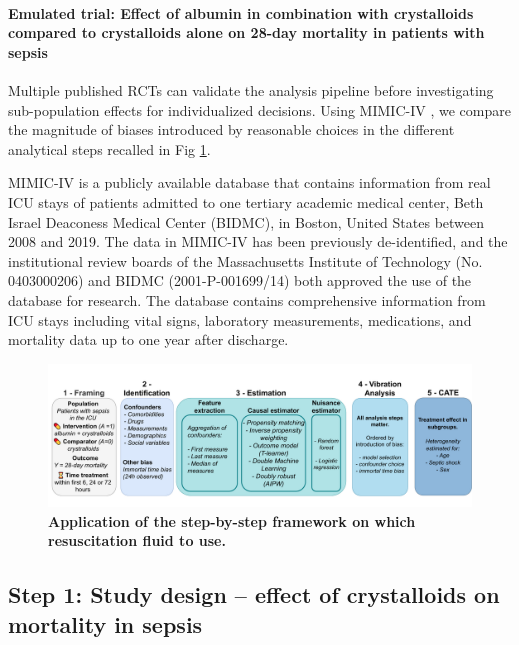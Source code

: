 \documentclass[10pt,letterpaper]{article}
\begin{document}
\paragraph{Emulated trial: Effect of albumin in combination with crystalloids
  compared to crystalloids alone on 28-day mortality in patients with sepsis}\label{emulated_trial}

Multiple published RCTs can validate the analysis pipeline before
investigating sub-population effects for individualized decisions. Using
MIMIC-IV \cite{johnson2020mimic}, we compare the magnitude of biases introduced by reasonable
choices in the different analytical steps recalled in Fig \ref{fig:study_summary}.

MIMIC-IV is a publicly available database that contains information from real
ICU stays of patients admitted to one tertiary academic medical center, Beth
Israel Deaconess Medical Center (BIDMC), in Boston, United States between 2008
and 2019. The data in MIMIC-IV has been previously de-identified, and the
institutional review boards of the Massachusetts Institute of Technology (No.
0403000206) and BIDMC (2001-P-001699/14) both approved the use of the database
for research. The database contains comprehensive information from ICU stays
including vital signs, laboratory measurements, medications, and mortality data
up to one year after discharge.

\begin{figure}[h!]
  \centering
  \includegraphics[width=\linewidth]{img_final/Fig2.pdf}
  \caption{\textbf{Application of the step-by-step framework on which resuscitation fluid to use.}}\label{fig:study_summary}
\end{figure}


\subsection*{Step 1: Study design -- effect of crystalloids on mortality in sepsis}%
\label{sec:framing_mimic_iv}
\end{document}
